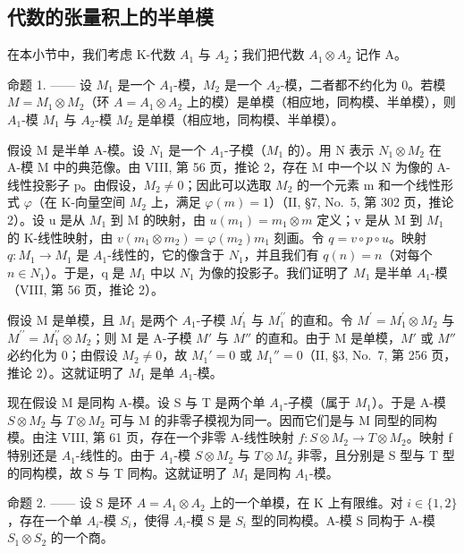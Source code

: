 \subsection{代数的张量积上的半单模}

在本小节中，我们考虑 K-代数 \(A_{1}\) 与 \(A_{2}\)；我们把代数 \(A_{1} \otimes A_{2}\) 记作 A。

命题 1. —— 设 \(M_{1}\) 是一个 \(A_{1}\)-模，\(M_{2}\) 是一个 \(A_{2}\)-模，二者都不约化为 0。若模 \(M = M_{1} \otimes M_{2}\)（环 \(A = A_{1} \otimes A_{2}\) 上的模）是单模（相应地，同构模、半单模），则 \(A_{1}\)-模 \(M_{1}\) 与 \(A_{2}\)-模 \(M_{2}\) 是单模（相应地，同构模、半单模）。

假设 M 是半单 A-模。设 \(N_{1}\) 是一个 \(A_{1}\)-子模（\(M_{1}\) 的）。用 N 表示 \(N_{1} \otimes M_{2}\) 在 A-模 M 中的典范像。由 VIII, 第 56 页，推论 2，存在 M 中一个以 N 为像的 A-线性投影子 p。由假设，\(M_{2} \neq 0\)；因此可以选取 \(M_{2}\) 的一个元素 m 和一个线性形式 \(\varphi\)（在 K-向量空间 \(M_{2}\) 上，满足 \(\varphi(m) = 1\)）（II, §7, No.~5, 第 302 页，推论 2）。设 u 是从 \(M_{1}\) 到 M 的映射，由 \(u(m_{1}) = m_{1} \otimes m\) 定义；v 是从 M 到 \(M_{1}\) 的 K-线性映射，由 \(v(m_{1} \otimes m_{2}) = \varphi(m_{2})m_{1}\) 刻画。令 \(q = v \circ p \circ u\)。映射 \(q : M_{1} \to M_{1}\) 是 \(A_{1}\)-线性的，它的像含于 \(N_{1}\)，并且我们有 \(q(n) = n\)（对每个 \(n \in N_{1}\)）。于是，q 是 \(M_{1}\) 中以 \(N_{1}\) 为像的投影子。我们证明了 \(M_{1}\) 是半单 \(A_{1}\)-模（VIII, 第 56 页，推论 2）。

假设 M 是单模，且 \(M_{1}\) 是两个 \(A_{1}\)-子模 \(M_{1}^{\prime}\) 与 \(M_{1}^{\prime\prime}\) 的直和。令 \(M^{\prime}=M_{1}^{\prime}\otimes M_{2}\) 与 \(M^{\prime\prime}=M_{1}^{\prime\prime}\otimes M_{2}\)；则 M 是 A-子模 \(M'\) 与 \(M''\) 的直和。由于 M 是单模，\(M'\) 或 \(M''\) 必约化为 0；由假设 \(M_{2} \neq 0\)，故 \(M_{1}' = 0\) 或 \(M_{1}'' = 0\)（II, §3, No.~7, 第 256 页，推论 2）。这就证明了 \(M_{1}\) 是单 \(A_{1}\)-模。

现在假设 M 是同构 A-模。设 S 与 T 是两个单 \(A_{1}\)-子模（属于 \(M_{1}\)）。于是 A-模 \(S \otimes M_{2}\) 与 \(T \otimes M_{2}\) 可与 M 的非零子模视为同一。因而它们是与 M 同型的同构模。由注 VIII, 第 61 页，存在一个非零 A-线性映射 \(f : S \otimes M_{2} \to T \otimes M_{2}\)。映射 f 特别还是 \(A_{1}\)-线性的。由于 \(A_{1}\)-模 \(S \otimes M_{2}\) 与 \(T \otimes M_{2}\) 非零，且分别是 S 型与 T 型的同构模，故 S 与 T 同构。这就证明了 \(M_{1}\) 是同构 \(A_{1}\)-模。

命题 2. —— 设 S 是环 \(A = A_{1} \otimes A_{2}\) 上的一个单模，在 K 上有限维。对 \(i \in \{1, 2\}\)，存在一个单 \(A_{i}\)-模 \(S_{i}\)，使得 \(A_{i}\)-模 S 是 \(S_{i}\) 型的同构模。A-模 S 同构于 A-模 \(S_{1} \otimes S_{2}\) 的一个商。

